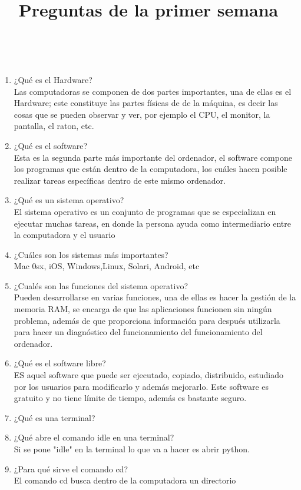 \documentclass[letterpaper, 12pt, oneside]{article}%
\begin{document}
	\newpage
	\title{\huge Preguntas de la primer semana}\\
	\begin{enumerate}
		\item 
		¿Qué es el Hardware?\\
		Las computadoras se componen de dos partes importantes, una de ellas es el Hardware; este constituye las partes físicas de de la máquina, es decir las cosas que se pueden observar y ver, por ejemplo el CPU, el monitor, la pantalla, el raton, etc.
		\item 
		¿Qué es el software?\\
		Esta es la segunda parte más importante del ordenador, el software compone los programas que están dentro de la computadora, los cuáles hacen posible realizar tareas específicas dentro de este mismo ordenador. 
		\item 
		¿Qué es un sistema operativo?\\
		El sistema operativo es un conjunto de programas que se especializan en ejecutar muchas tareas, en donde la persona ayuda como intermediario entre la computadora y el usuario
		\item 
		¿Cuáles son los sistemas más importantes?\\
		Mac 0sx, iOS, Windows,Linux, Solari, Android, etc
		\item 
		¿Cualés son las funciones del sistema operativo?\\
		Pueden desarrollarse en varias funciones, una de ellas es hacer la gestión de la memoria RAM, se encarga de que las aplicaciones funcionen sin ningún problema, además de que proporciona información para después utilizarla para hacer un diagnóstico del funcionamiento del funcionamiento del ordenador.
		\item 
		¿Qué es el software libre?\\
		ES aquel software que puede ser ejecutado, copiado, distribuido, estudiado por los usuarios para modificarlo y además mejorarlo.
		Este software es gratuito y no tiene límite de tiempo, además es bastante seguro.
		\item 
		¿Qué es una terminal?\\
		\item
		¿Qué abre el comando idle en una terminal?\\
		Si se pone "idle" en la terminal lo que va a hacer es abrir python.
		\item 
		¿Para qué sirve el comando cd?\\
		El comando cd busca dentro de la computadora un directorio

\end{enumerate}
\end{document}
